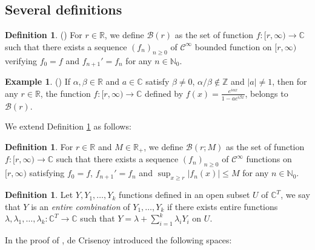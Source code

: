 \documentclass[a4paper,12pt]{article}
\theoremstyle{definition}
\newtheorem{example}[thm]{Example}
\newtheorem{definition}[thm]{Definition}
\numberwithin{equation}{section}
\def\N{{\mathbb N}}
\def\Z{{\mathbb Z}}
\def\R{{\mathbb R}}
\def\C{{\mathbb C}}
\newcommand{\ii}{i}
\newcommand{\phie}{e}
\let\ds=\displaystyle
\begin{document}
\subsection{Several definitions}
 
 \begin{definition}\label{classBr} 
 (\cite[Definition 2.3]{dC})
 For $r\in \R$, we define $\mathcal B (r)$ as the set of function $f: [r, \infty)\to \C$ such that there exists a sequence 
 $(f_n)_{n\geq 0}$ of $\mathcal C^\infty$ bounded function on $[r, \infty)$ verifying $f_0=f$ and $f_{n+1}'=f_n$ for any $n\in \N_0$.
 \end{definition}

\begin{example}
(\cite[Example 2.6]{dC})
If $\alpha, \beta \in \R$ and $a\in \C$ satisfy $\beta \neq 0$, $\alpha/\beta \not \in \Z$ and $|a|\neq 1$, then for any $r\in \R$, the function $f : [r, \infty)\to \C$ defined by $\ds f(x)=\frac{\phie^{\ii \alpha x}}{1-a \phie^{\ii \beta x}}$, belongs to $\mathcal B(r)$.    
\end{example}
We extend Definition \ref{classBr} as follows:
 \begin{definition}\label{classBrM+} 
 For $r\in \R$ and $M\in \R_+$, we define $\mathcal B (r;M)$ as the set of function $f: [r, \infty)\to \C$ such that there exists a sequence 
 $(f_n)_{n\geq 0}$ of $\mathcal C^\infty$ functions on $[r, \infty)$ satisfying $f_0=f$, $f_{n+1}'=f_n$ and 
 $\sup_{x\geq r}|f_n(x)|\leq M$ for any $n\in \N_0$.
 \end{definition}

\begin{definition}\label{entirecomb+}
Let $Y, Y_1,\ldots, Y_k$ functions defined in an open subset $U$ of $\C^T$, we say that $Y$ is an {\it entire combination} of $Y_1,\ldots, Y_k$ if there exists entire functions $\lambda, \lambda_1, \ldots, \lambda_k :\C^T\to \C$ such that $Y=\lambda + \sum_{i=1}^k \lambda_i Y_i$ on $U$. 
\end{definition}

In the proof of \cite[Theorem 2.7]{dC}, de Crisenoy introduced the following spaces:
\end{document}
